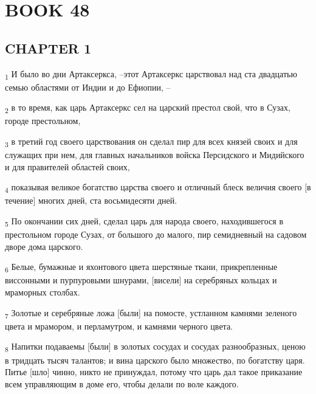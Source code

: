 \section{BOOK 48}
\subsection{CHAPTER 1}
\begin{tcolorbox}
\textsubscript{1} И было во дни Артаксеркса, --этот Артаксеркс царствовал над ста двадцатью семью областями от Индии и до Ефиопии, --
\end{tcolorbox}
\begin{tcolorbox}
\textsubscript{2} в то время, как царь Артаксеркс сел на царский престол свой, что в Сузах, городе престольном,
\end{tcolorbox}
\begin{tcolorbox}
\textsubscript{3} в третий год своего царствования он сделал пир для всех князей своих и для служащих при нем, для главных начальников войска Персидского и Мидийского и для правителей областей своих,
\end{tcolorbox}
\begin{tcolorbox}
\textsubscript{4} показывая великое богатство царства своего и отличный блеск величия своего [в течение] многих дней, ста восьмидесяти дней.
\end{tcolorbox}
\begin{tcolorbox}
\textsubscript{5} По окончании сих дней, сделал царь для народа своего, находившегося в престольном городе Сузах, от большого до малого, пир семидневный на садовом дворе дома царского.
\end{tcolorbox}
\begin{tcolorbox}
\textsubscript{6} Белые, бумажные и яхонтового цвета шерстяные ткани, прикрепленные виссонными и пурпуровыми шнурами, [висели] на серебряных кольцах и мраморных столбах.
\end{tcolorbox}
\begin{tcolorbox}
\textsubscript{7} Золотые и серебряные ложа [были] на помосте, устланном камнями зеленого цвета и мрамором, и перламутром, и камнями черного цвета.
\end{tcolorbox}
\begin{tcolorbox}
\textsubscript{8} Напитки подаваемы [были] в золотых сосудах и сосудах разнообразных, ценою в тридцать тысяч талантов; и вина царского было множество, по богатству царя. Питье [шло] чинно, никто не принуждал, потому что царь дал такое приказание всем управляющим в доме его, чтобы делали по воле каждого.
\end{tcolorbox}
